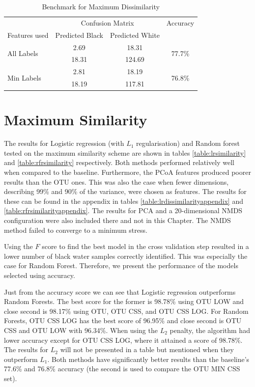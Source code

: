 \begin{table}[!h]
	\centering
		\caption{Benchmark for Maximum Dissimilarity}
	\label{table:benchmarkrand}
	\begin{tabular}{l c c c }
		\toprule 
		&\multicolumn{2}{c}{Confusion Matrix} & Accuracy\\
		Features used & Predicted Black&Predicted White&\\ 
		
		\midrule
		\multirow{2}{*}{All Labels }& 2.69 &18.31&\multirow{2}{*}{77.7\%}\\
		&	 18.31&124.69 &\\
		\cmidrule{2-3}
		\multirow{2}{*}{Min Labels}    &2.81&18.19&\multirow{2}{*}{76.8\% }\\
		&18.19&117.81&\\
		\bottomrule
	\end{tabular}

\end{table}
%
\section{Maximum Similarity}
The results for Logistic regression (with $L_1$ regularisation) and Random forest tested on the maximum similarity scheme are shown in tables \ref{table:lrsimilarity} and \ref{table:rfrsimilarity} respectively. Both methods performed relatively well when compared to the baseline. Furthermore, the PCoA features produced poorer results than the OTU ones. This was also the case when fewer dimensions, describing 99\% and 90\% of the variance, were chosen as features. The results for these can be found in the appendix in tables \ref{table:lrdissimilarityappendix} and \ref{table:rfrsimilarityappendix}. The results for PCA and a 20-dimensional NMDS configuration were also included there and not in this Chapter. The NMDS method failed to converge to a minimum stress.

Using the $F$ score to find the best model in the cross validation step resulted in a lower number of black water samples correctly identified. This was especially the case for Random Forest. Therefore, we present the performance of the models selected using accuracy.

Just from the accuracy score we can see that Logistic regression outperforms Random Forests. The best score for the former is 98.78\% using OTU LOW and close second is 98.17\% using OTU, OTU CSS, and OTU CSS LOG. For Random Forests, OTU CSS LOG has the best score of 96.95\% and close second is OTU CSS and OTU LOW with 96.34\%. When using the $L_2$ penalty, the algorithm had lower accuracy except for OTU CSS LOG, where it attained a score of 98.78\%. The results for $L_2$ will not be presented in a table but mentioned when they outperform $L_1$.  Both methods have significantly better results than the baseline's 77.6\% and 76.8\% accuracy (the second is used to compare the OTU MIN CSS set).


